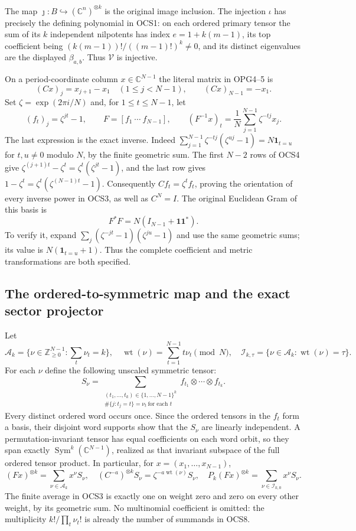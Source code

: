\documentclass[11pt,a4paper]{article}
\begin{document}
The map $\jmath:B\hookrightarrow(\mathbb C^n)^{\otimes k}$
is the original image inclusion. The injection $\iota$ has precisely
the defining polynomial in OCS1: on each ordered primary tensor
the sum of its $k$ independent nilpotents has index
$e=1+k(m-1)$, its top coefficient being
$(k(m-1))!/((m-1)!)^k\ne0$, and its distinct eigenvalues are
the displayed $\beta_{a,b}$. Thus $\mathcal V$ is injective.

On a period-coordinate column $x\in\mathbb C^{N-1}$ the literal
matrix in OPG4--5 is
\[
 (Cx)_j=x_{j+1}-x_1\quad(1\leq j<N-1),\qquad
 (Cx)_{N-1}=-x_1.
 \tag{OCS4}
\]
Set $\zeta=\exp(2\pi i/N)$ and, for $1\leq t\leq N-1$, let
\[
 (f_t)_j=\zeta^{jt}-1,\qquad
 F=[f_1\ \cdots\ f_{N-1}],\qquad
 (F^{-1}x)_t=\frac1N\sum_{j=1}^{N-1}\zeta^{-tj}x_j.
 \tag{OCS5}
\]
The last expression is the exact inverse. Indeed
$\sum_{j=1}^{N-1}\zeta^{-tj}(\zeta^{uj}-1)=N\mathbf1_{t=u}$
for $t,u\ne0$ modulo $N$, by the finite geometric sum.
The first $N-2$ rows of OCS4 give
$\zeta^{(j+1)t}-\zeta^t=\zeta^t(\zeta^{jt}-1)$, and the
last row gives $1-\zeta^t=\zeta^t(\zeta^{(N-1)t}-1)$.
Consequently $Cf_t=\zeta^tf_t$, proving the orientation of
every inverse power in OCS3, as well as $C^N=I$.
The original Euclidean Gram of this basis is
\[
 F^*F=N(I_{N-1}+\mathbf1\mathbf1^*).
 \tag{OCS6}
\]
To verify it, expand
$\sum_j(\zeta^{-jt}-1)(\zeta^{ju}-1)$ and use the same
geometric sums; its value is $N(\mathbf1_{t=u}+1)$.
Thus the complete coefficient and metric transformations are
both specified.

\subsection{The ordered-to-symmetric map and the exact sector projector}
Let
\[
 \mathcal A_k=\{\nu\in\mathbb Z_{\geq0}^{N-1}:\sum_t\nu_t=k\},
 \quad\operatorname{wt}(\nu)=\sum_{t=1}^{N-1}t\nu_t\pmod N,
 \quad\mathcal I_{k,\tau}=\{\nu\in\mathcal A_k:
                                      \operatorname{wt}(\nu)=\tau\}.
 \tag{OCS7}
\]
For each $\nu$ define the following unscaled symmetric tensor:
\[
 S_\nu=\sum_{\substack{(t_1,\ldots,t_k)\in\{1,\ldots,N-1\}^k\\
                   \#\{j:t_j=t\}=\nu_t\ \text{for each }t}}
                    f_{t_1}\otimes\cdots\otimes f_{t_k}.
 \tag{OCS8}
\]
Every distinct ordered word occurs once. Since the ordered tensors
in the $f_t$ form a basis, their disjoint word supports show that
the $S_\nu$ are linearly independent. A permutation-invariant tensor
has equal coefficients on each word orbit, so they span exactly
$\operatorname{Sym}^k(\mathbb C^{N-1})$, realized as that invariant
subspace of the full ordered tensor product. In particular, for
$x=(x_1,\ldots,x_{N-1})$,
\[
 (Fx)^{\otimes k}=\sum_{\nu\in\mathcal A_k}x^\nu S_\nu,
 \quad
 (C^{-a})^{\otimes k}S_\nu=
                         \zeta^{-a\operatorname{wt}(\nu)}S_\nu,
 \quad
 P_k(Fx)^{\otimes k}=\sum_{\nu\in\mathcal I_{k,0}}x^\nu S_\nu.
 \tag{OCS9}
\]
The finite average in OCS3 is exactly one on weight zero and
zero on every other weight, by its geometric sum. No multinomial
coefficient is omitted: the multiplicity $k!/\prod_t\nu_t!$
is already the number of summands in OCS8.
\end{document}
